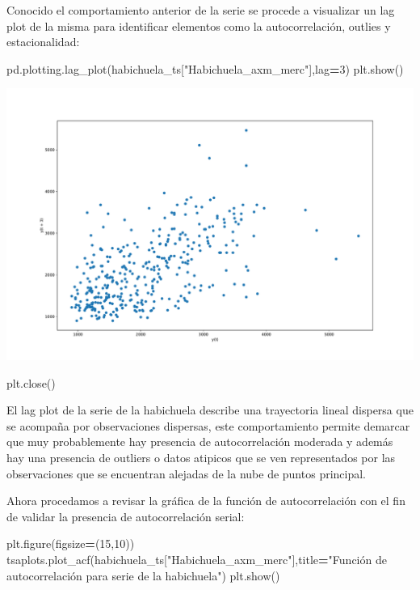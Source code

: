 \documentclass[
]{book}
\newenvironment{Shaded}{\begin{snugshade}}{\end{snugshade}}
\newcommand{\DecValTok}[1]{\textcolor[rgb]{0.00,0.00,0.81}{#1}}
\newcommand{\NormalTok}[1]{#1}
\newcommand{\OperatorTok}[1]{\textcolor[rgb]{0.81,0.36,0.00}{\textbf{#1}}}
\newcommand{\StringTok}[1]{\textcolor[rgb]{0.31,0.60,0.02}{#1}}
\begin{document}
Conocido el comportamiento anterior de la serie se procede a visualizar un lag plot de la misma para identificar elementos como la autocorrelación, outlies y estacionalidad:

\begin{Shaded}
\begin{Highlighting}[]

\NormalTok{pd.plotting.lag\_plot(habichuela\_ts[}\StringTok{"Habichuela\_axm\_merc"}\NormalTok{],lag}\OperatorTok{=}\DecValTok{3}\NormalTok{)}
\NormalTok{plt.show()}
\end{Highlighting}
\end{Shaded}

\includegraphics{bookdown-demo_files/figure-latex/unnamed-chunk-66-31.pdf}

\begin{Shaded}
\begin{Highlighting}[]
\NormalTok{plt.close()}
\end{Highlighting}
\end{Shaded}

El lag plot de la serie de la habichuela describe una trayectoria lineal dispersa que se acompaña por observaciones dispersas, este comportamiento permite demarcar que muy probablemente hay presencia de autocorrelación moderada y además hay una presencia de outliers o datos atipicos que se ven representados por las observaciones que se encuentran alejadas de la nube de puntos principal.

Ahora procedamos a revisar la gráfica de la función de autocorrelación con el fin de validar la presencia de autocorrelación serial:

\begin{Shaded}
\begin{Highlighting}[]

\NormalTok{plt.figure(figsize}\OperatorTok{=}\NormalTok{(}\DecValTok{15}\NormalTok{,}\DecValTok{10}\NormalTok{))}
\NormalTok{tsaplots.plot\_acf(habichuela\_ts[}\StringTok{"Habichuela\_axm\_merc"}\NormalTok{],title}\OperatorTok{=}\StringTok{"Función de autocorrelación para serie de la habichuela"}\NormalTok{)}
\NormalTok{plt.show()}
\end{Highlighting}
\end{Shaded}
\end{document}
